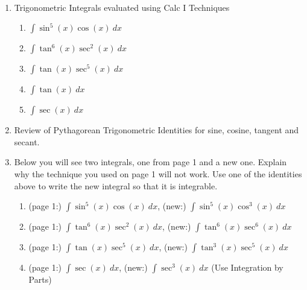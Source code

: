 \documentclass[11pt,fleqn]{article}
\begin{document}
\renewcommand{\headrulewidth}{0pt}
\newcommand{\blank}[1]{\rule{#1}{0.75pt}}
\newcommand{\bc}{\begin{center}}
\newcommand{\ec}{\end{center}}
\renewcommand{\d}{\displaystyle}

\vspace*{-0.7in}

\begin{center}
  \large
  \\
   
\end{center}

\begin{enumerate}
\item Trigonometric Integrals evaluated using Calc I Techniques
	\begin{enumerate}
	\item $\displaystyle{\int \sin^5(x) \cos(x)\: dx}$
	\vfill
	\item $\displaystyle{\int \tan^6(x) \sec^2(x)\: dx}$
	\vfill
	\item $\displaystyle{\int  \tan(x)\sec^5(x)\: dx}$
	\vfill
	\item $\displaystyle{\int \tan(x) \: dx}$
	\vfill
	\item $\displaystyle{\int \sec(x)\: dx}$
	\vfill
	\end{enumerate}

\item Review of Pythagorean Trigonometric Identities for sine, cosine, tangent and secant.
\vspace{1in}
\newpage
\item Below you will see two integrals, one from page 1 and a new one. Explain why the technique you used on page 1 will not work. Use one of the identities above to write the new integral so that it is integrable.
	\begin{enumerate}
	\item (page 1:) $\displaystyle{\int \sin^5(x) \cos(x)\: dx}$, (new:) $\displaystyle{\int \sin^5(x) \cos^3(x)\: dx}$
	\vfill
	\item (page 1:) $\displaystyle{\int \tan^6(x) \sec^2(x)\: dx}$, (new:) $\displaystyle{\int \tan^6(x) \sec^6(x)\: dx}$
	\vfill
	\item (page 1:) $\displaystyle{\int  \tan(x)\sec^5(x)\: dx}$, (new:) $\displaystyle{\int \tan^3(x) \sec^5(x)\: dx}$
	\vfill
	\item (page 1:) $\displaystyle{\int \sec(x) \: dx}$, (new:)  $\displaystyle{\int \sec^3(x) \: dx}$ (Use Integration by Parts)
	\vfill
	\end{enumerate}
\end{enumerate}
\end{document}
